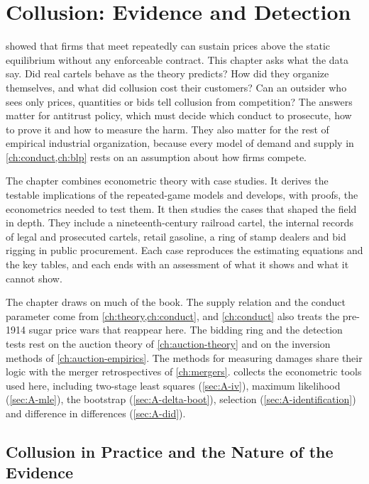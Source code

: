 \chapter{Collusion: Evidence and Detection}\label{ch:collusion-evidence}

 showed that firms that meet repeatedly can sustain prices above the static equilibrium
without any enforceable contract. This chapter asks what the data say. Did real cartels behave as the theory
predicts? How did they organize themselves, and what did collusion cost their customers? Can an outsider who sees
only prices, quantities or bids tell collusion from competition? The answers matter for antitrust policy, which
must decide which conduct to prosecute, how to prove it and how to measure the harm. They also matter for the rest
of empirical industrial organization, because every model of demand and supply in \cref{ch:conduct,ch:blp} rests on
an assumption about how firms compete.

The chapter combines econometric theory with case studies. It derives the testable implications of the
repeated-game models and develops, with proofs, the econometrics needed to test them. It then studies the cases
that shaped the field in depth. They include a nineteenth-century railroad cartel, the internal records of legal
and prosecuted cartels, retail gasoline, a ring of stamp dealers and bid rigging in public procurement. Each case
reproduces the estimating equations and the key tables, and each ends with an assessment of what it shows and what
it cannot show.

The chapter draws on much of the book. The supply relation and the conduct parameter come from
\cref{ch:theory,ch:conduct}, and \cref{ch:conduct} also treats the pre-1914 sugar price wars that reappear here.
The bidding ring and the detection tests rest on the auction theory of \cref{ch:auction-theory} and on the
inversion methods of \cref{ch:auction-empirics}. The methods for measuring damages share their logic with the
merger retrospectives of \cref{ch:mergers}.  collects the econometric tools used here,
including two-stage least squares (\cref{sec:A-iv}), maximum likelihood (\cref{sec:A-mle}), the bootstrap
(\cref{sec:A-delta-boot}), selection (\cref{sec:A-identification}) and difference in differences
(\cref{sec:A-did}).

\section{Collusion in Practice and the Nature of the Evidence}\label{sec:13-intro}

